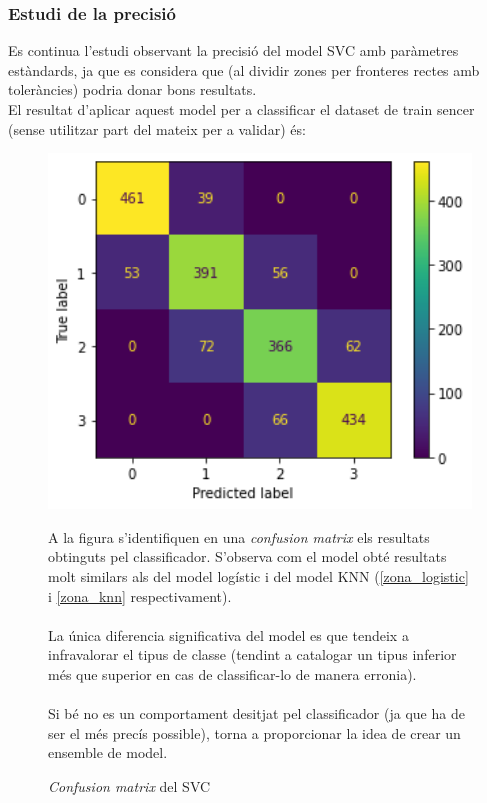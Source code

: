 \documentclass[a4paper, 11pt]{article}
\begin{document}
\subsubsection{Estudi de la precisió}
Es continua l'estudi observant la precisió del model SVC amb paràmetres estàndards, ja que es considera que (al dividir zones per fronteres rectes amb toleràncies) podria donar bons resultats.\\
El resultat d'aplicar aquest model per a classificar el dataset de train sencer (sense utilitzar part del mateix per a validar) és:
\begin{figure}[h] %
\begin{minipage}{7cm} %
\begin{center}
    \includegraphics[width=1\textwidth]{ConfMatrix/confusionmatrix_svc.png}
    \caption{\textit{Confusion matrix} del SVC}
\end{center}
\end{minipage} %
\hspace{2em}
\begin{minipage}{7cm} %
A la figura s'identifiquen en una \textit{confusion matrix} els resultats obtinguts pel classificador. S'observa com el model obté resultats molt similars als del model logístic i del model KNN (\textcolor{blue}{\ref{zona_logistic}} i \textcolor{blue}{\ref{zona_knn}} respectivament).\\\\
La única diferencia significativa del model es que tendeix a infravalorar el tipus de classe (tendint a catalogar un tipus inferior més que superior en cas de classificar-lo de manera erronia).\\\\
Si bé no es un comportament desitjat pel classificador (ja que ha de ser el més precís possible), torna a proporcionar la idea de crear un ensemble de model.
\end{minipage} %
\end{figure} %
\end{document}

